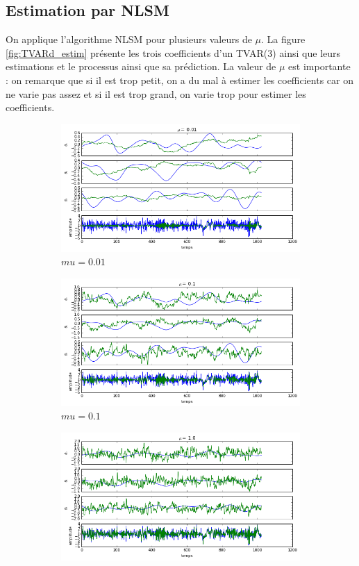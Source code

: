 \documentclass{report}
\begin{document}
\subsection{Estimation par NLSM}
On applique l'algorithme NLSM pour plusieurs valeurs de $\mu$. La figure \ref{fig:TVARd_estim} présente les trois coefficients d'un TVAR(3) ainsi que leurs estimations et le processus ainsi que sa prédiction. La valeur de $\mu$ est importante : on remarque que si il est trop petit, on a du mal à estimer les coefficients car on ne varie pas assez et si il est trop grand, on varie trop pour estimer les coefficients.
\begin{figure}[h]
\begin{subfigure}{\textwidth}
\centering
\includegraphics[scale=0.6]{presentation/images/TVARd_estim_mu001.png}
\caption{$mu = 0.01$}
\end{subfigure}
\begin{subfigure}{\textwidth}
\centering
\includegraphics[scale=0.6]{presentation/images/TVARd_estim_mu01.png}
\caption{$mu = 0.1$}
\end{subfigure}
\begin{subfigure}{\textwidth}
\centering
\includegraphics[scale=0.6]{presentation/images/TVARd_estim_mu1.png}

\end{subfigure}
\end{figure}
\end{document}
